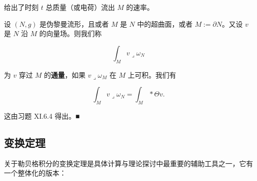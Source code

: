 \begin{remark}
给出了时刻 $ t $ 总质量（或电荷）流出 $ M $ 的速率。

\begin{subitems}
\item

设 $ (N, g) $ 是伪黎曼流形，且或者 $ M $ 是 $ N $ 中的超曲面，或者 $ M := \partial N $。又设 $ v $ 是 $ N $ 沿 $ M $ 的向量场。则我们称

\[
\int_M v \lrcorner \omega_N
\]

为 $ v $ 穿过 $ M $ 的\textbf{通量}，如果 $ v \lrcorner \omega_M $ 在 $ M $ 上可积。我们有

\[
\int_M v \lrcorner \omega_N = \int_M \ast\Theta v .
\]

\proofhead
这由习题 XI.6.4 得出。\nobreak\hspace{0.35em}■
\end{subitems}

\end{remark}

\subsection*{变换定理}

关于勒贝格积分的变换定理是具体计算与理论探讨中最重要的辅助工具之一，它有一个整体化的版本：

